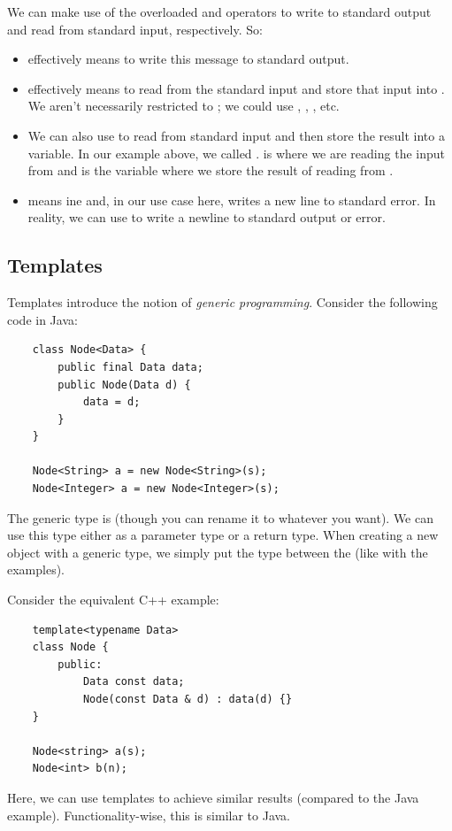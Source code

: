 \documentclass[letterpaper]{article}
\begin{document}
\bigskip 

We can make use of the overloaded \code{<<} and \code{>>} operators to write to standard output and read from standard input, respectively. So: 
\begin{itemize}
    \item {} effectively means to write this message to standard output. 
    \item {} effectively means to read from the standard input and store that input into . We aren't necessarily restricted to ; we could use , , , etc. 
    \item We can also use  to read from standard input and then store the result into a variable. In our example above, we called .  is where we are reading the input from and  is the variable where we store the result of reading from . 
    \item {} means  ine and, in our use case here, writes a new line to standard error. In reality, we can use  to write a newline to standard output or error.  
\end{itemize}

\subsection{Templates}
Templates introduce the notion of \emph{generic programming}. Consider the following code in Java: 
\begin{verbatim}
    class Node<Data> {
        public final Data data; 
        public Node(Data d) {
            data = d;
        }
    }

    Node<String> a = new Node<String>(s);
    Node<Integer> a = new Node<Integer>(s);
\end{verbatim}
The generic type is  (though you can rename it to whatever you want). We can use this type either as a parameter type or a return type. When creating a new object with a generic type, we simply put the type between the \code{<>} (like with the  examples).

\bigskip 

Consider the equivalent C++ example: 
\begin{verbatim}
    template<typename Data>
    class Node {
        public: 
            Data const data; 
            Node(const Data & d) : data(d) {}
    }

    Node<string> a(s);
    Node<int> b(n);
\end{verbatim}
Here, we can use templates to achieve similar results (compared to the Java example). Functionality-wise, this is similar to Java. 
\end{document}
